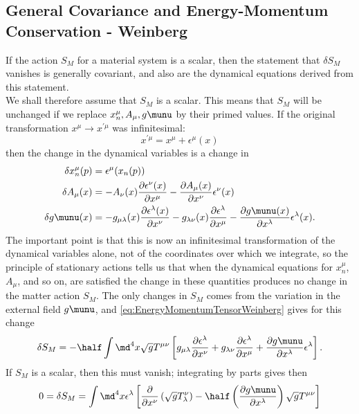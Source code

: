 \subsection{General Covariance and Energy-Momentum Conservation - Weinberg}
If the action $S_M$ for a material system is a scalar, then the statement that $\delta S_M$ vanishes is generally covariant, and also are the dynamical equations derived from this statement.\\
We shall therefore assume that $S_M$ is a scalar. This means that $S_M$ will be unchanged if we replace $x^\mu_n, A_\mu,g\munu$ by their primed values. If the original transformation $x^\mu\rightarrow x^{\prime \mu} $ was infinitesimal:
\begin{equation}
	x^{\prime \mu} = x^\mu + \epsilon^\mu(x)
\end{equation}
then the change in the dynamical variables is a change in 
\begin{align}
	\label{eq:variationalprincipleVariableChange}
\delta x^\mu_n(p) &= \epsilon^\mu(x_n(p)) \\
\delta A_\mu(x) &= -A_\nu(x) \frac{\partial \epsilon^\nu (x)}{\partial x^\mu} - \frac{\partial A_\mu(x)}{\partial x^\nu} \epsilon^\nu(x)\\
\delta g\munu(x) &= -g_{\mu \lambda} (x) \frac{\partial \epsilon^\lambda(x)}{\partial x^\nu} - g_{\lambda \nu} (x) \frac{\partial \epsilon^\lambda}{\partial x^\mu} - \frac{\partial g\munu(x)}{\partial x^\lambda} \epsilon^\lambda(x).
\end{align} 
The important point is that this is now an infinitesimal transformation of the dynamical variables alone, not of the coordinates over which we integrate, so the principle of stationary actions tells us that when the dynamical equations for $x^\mu_n$, $A_\mu$, and so on, are satisfied the change in these quantities produces no change in the matter action $S_M$. The only changes in $S_M$ comes from the variation in the external field $g\munu$, and \ref{eq:EnergyMomentumTensorWeinberg} gives for this change
\begin{equation}
	\delta S_M = - \half \int \md^4 x \sqrt{g} T^{\mu \nu} \left[g_{\mu \lambda} \frac{\partial \epsilon^\lambda}{\partial x^\nu} + g_{\lambda \nu} \frac{\partial \epsilon^\lambda}{\partial x^\mu} + \frac{\partial g\munu}{\partial x^\lambda} \epsilon^\lambda\right].
\end{equation}
If $S_M$ is a scalar, then this must vanish; integrating by parts gives then
\begin{equation}
	0 = \delta S_M=\int \md^4 x \epsilon^\lambda \left[ \frac{\partial}{\partial x^\nu} \left(\sqrt{g} T^\nu_\lambda\right)-\half \left(\frac{\partial g\munu}{\partial x^\lambda}\right)\sqrt{g} T^{\mu \nu}\right]
\end{equation}
